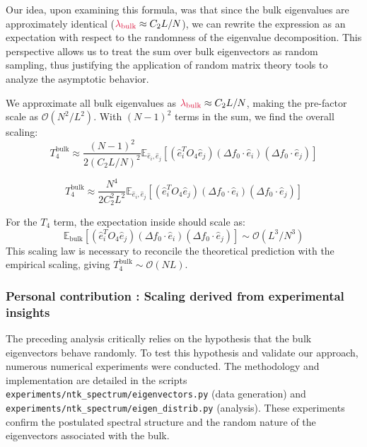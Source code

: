 \documentclass[a4paper]{article}
\theoremstyle{plain}
\theoremstyle{definition}
\theoremstyle{remark}
\begin{document}
\begin{tcolorbox}[colback=green!10,colframe=green!60!black,title={\textbf{Remarque personnelle}},enhanced,drop shadow]
Our idea, upon examining this formula, was that since the bulk eigenvalues are approximately identical ($\textcolor{kernelcolor}{\lambda_{\text{bulk}}} \approx C_2 L/N$), we can rewrite the expression as an expectation with respect to the randomness of the eigenvalue decomposition. This perspective allows us to treat the sum over bulk eigenvectors as random sampling, thus justifying the application of random matrix theory tools to analyze the asymptotic behavior.
\end{tcolorbox}

We approximate all bulk eigenvalues as $\textcolor{kernelcolor}{\lambda_{\text{bulk}}} \approx C_2 L/N$, making the pre-factor scale as $\mathcal{O}(N^2/L^2)$. With $(N-1)^2$ terms in the sum, we find the overall scaling:
\begin{equation}
T_4^{\text{bulk}} \approx \frac{(N-1)^2}{2(C_2 L/N)^2} \mathbb{E}_{\hat{e}_i, \hat{e}_j} \left[ (\hat{e}_{i}^{T}O_{4}\hat{e}_{j})(\Delta f_{0}\cdot \hat{e}_{i})(\Delta f_{0}\cdot \hat{e}_{j}) \right]
\end{equation}

\begin{equation}
T_4^{\text{bulk}} \approx \frac{N^4}{2C_2^2 L^2} \mathbb{E}_{\hat{e}_i, \hat{e}_j} \left[ (\hat{e}_{i}^{T}O_{4}\hat{e}_{j})(\Delta f_{0}\cdot \hat{e}_{i})(\Delta f_{0}\cdot \hat{e}_{j}) \right]
\end{equation}

\begin{tcolorbox}[colback=green!10,colframe=green!60!black,title={\textbf{Expectation Scaling for $T_4$ Bulk Term}},enhanced,drop shadow]
For the $T_4$ term, the expectation inside should scale as:
\begin{equation}
\mathbb{E}_{\text{bulk}} \left[ (\hat{e}_{i}^{T}O_{4}\hat{e}_{j})(\Delta f_{0}\cdot \hat{e}_{i})(\Delta f_{0}\cdot \hat{e}_{j}) \right] \sim \mathcal{O}(L^3/N^3)
\end{equation}
This scaling law is necessary to reconcile the theoretical prediction with the empirical scaling, giving $T_4^{\text{bulk}} \sim \mathcal{O}(NL)$.
\end{tcolorbox}

\subsubsection{Personal contribution : Scaling derived from experimental insights}
The preceding analysis critically relies on the hypothesis that the bulk eigenvectors behave randomly. To test this hypothesis and validate our approach, numerous numerical experiments were conducted. The methodology and implementation are detailed in the scripts \texttt{experiments/ntk\_spectrum/eigenvectors.py} (data generation) and \texttt{experiments/ntk\_spectrum/eigen\_distrib.py} (analysis). These experiments confirm the postulated spectral structure and the random nature of the eigenvectors associated with the bulk.
\end{document}
